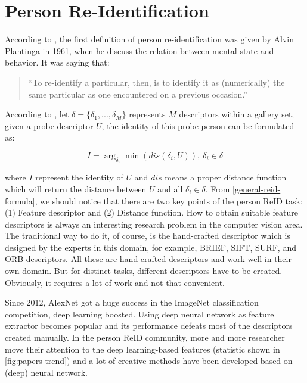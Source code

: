 \section{Person Re-Identification}
\label{sec:related_work_re_id}

According to \cite{survey-reid-past-present-feature-2016}, the first definition
of person re-identification was given by Alvin Plantinga in 1961, when he 
discuss the relation between mental state and behavior. It was saying that:

\begin{quotation}
``To re-identify a particular, then, is to identify it as (numerically) the
same particular as one encountered on a previous occasion.''
\end{quotation}

According to \cite{survey-on-dl-for-reid-2019}, let $\delta=\{\delta_1, ...,
\delta_M \}$ represents $M$ descriptors within a gallery set, given a probe
descriptor $U$, the identity of this probe person can be formulated as:

\begin{equation}
\label{general-reid-formula}
I = \arg_{\delta_i} \min (dis(\delta_i, U)),  \: \delta_i \in \delta
\end{equation}

\noindent 
where $I$ represent the identity of $U$ and $dis$ means a proper distance
function which will return the distance between $U$ and all $\delta_i \in 
\delta$. From \autoref{general-reid-formula}, we should notice that there are 
two key points of the person ReID task:
(1) Feature descriptor and (2) Distance function.
How to obtain suitable feature descriptors is always an interesting research
problem in the computer vision area. The traditional way to do it, of course, is
the hand-crafted descriptor which is designed by the experts in this domain, for
example, BRIEF, SIFT, SURF, and ORB descriptors. All these are hand-crafted
descriptors and work well in their own domain. But for distinct tasks, different
descriptors have to be created. Obviously, it requires a lot of work and not
that convenient.

Since 2012, AlexNet \cite{imagenet-classifi-cnn} got a huge success in the
ImageNet classification competition, deep learning boosted. Using deep
neural network as feature extractor becomes popular and its performance defeats
most of the descriptors created manually. In the person ReID community, more 
and more researcher move their attention to the deep learning-based features 
(statistic shown in \autoref{fig:papers-trend}) and a lot of creative methods 
have been developed based on (deep) neural network.

